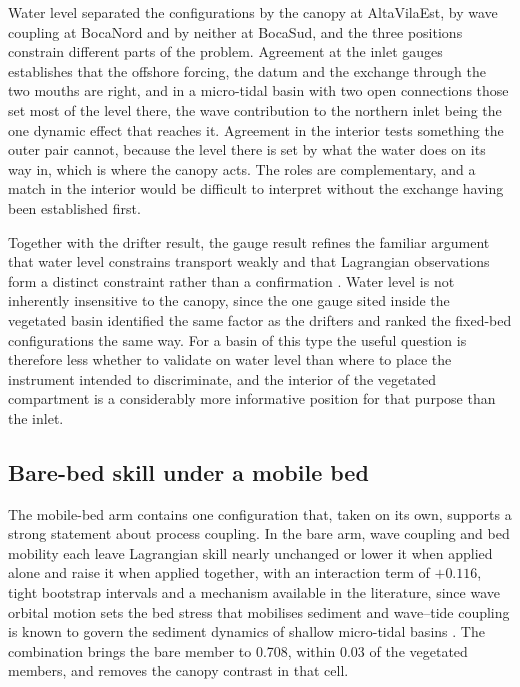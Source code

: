 Water level separated the configurations by the canopy at AltaVilaEst, by wave
coupling at BocaNord and by neither at BocaSud, and the three positions
constrain different parts of the problem. Agreement at the inlet gauges
establishes that the offshore forcing, the datum and the exchange through the
two mouths are right, and in a micro-tidal basin with two open connections those
set most of the level there, the wave contribution to the northern inlet being
the one dynamic effect that reaches it. Agreement in the interior tests
something the outer pair cannot, because the level there is set by what the
water does on its way in, which is where the canopy acts. The roles are
complementary, and a match in the interior would be difficult to interpret
without the exchange having been established first.

Together with the drifter result, the gauge result refines the familiar argument
that water level constrains transport weakly and that Lagrangian observations
form a distinct constraint rather than a confirmation \citep{Liu2011,
Revelard2021}. Water level is not inherently insensitive to the canopy, since
the one gauge sited inside the vegetated basin identified the same factor as the
drifters and ranked the fixed-bed configurations the same way. For a basin of
this type the useful question is therefore less whether to validate on water
level than where to place the instrument intended to discriminate, and the
interior of the vegetated compartment is a considerably more informative
position for that purpose than the inlet.

\subsection{Bare-bed skill under a mobile bed}
\label{sec:disc_synergy}

The mobile-bed arm contains one configuration that, taken on its own, supports
a strong statement about process coupling. In the bare arm, wave coupling and
bed mobility each leave Lagrangian skill nearly unchanged or lower it when
applied alone and raise it when applied together, with an interaction term of
$+0.116$, tight bootstrap intervals and a mechanism available in the literature,
since wave orbital motion sets the bed stress that mobilises sediment and
wave--tide coupling is known to govern the sediment dynamics of shallow
micro-tidal basins \citep{Carniello2011}. The combination brings the bare
member to 0.708, within 0.03 of the vegetated members, and removes the canopy
contrast in that cell.

